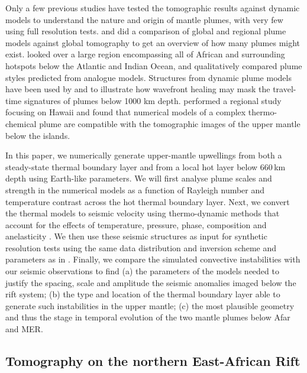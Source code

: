 \documentclass[a4paper,10pt,twocolumn]{paper}
\begin{document}
Only a few previous studies have tested the tomographic results against dynamic models to understand the nature and origin of mantle plumes, with very few using full resolution tests. \cite{boschi-etal-2007} and \cite{styles-etal-2011} did a comparison of global and regional plume models against global tomography to get an overview of how many plumes might exist. \cite{davaille-etal-2005} looked over a large region encompassing all of African and surrounding hotspots below the Atlantic and Indian Ocean, and qualitatively compared plume styles predicted from analogue models. Structures from dynamic plume models have been used by \cite{hwang-etal-2011} and \cite{maguire-etal-2016} to illustrate how wavefront healing may mask the travel-time signatures of plumes below 1000 km depth. \cite{ballmer-etal-2013} performed a regional study focusing on Hawaii and found that numerical models of a complex thermo-chemical plume are compatible with the tomographic images of the upper mantle below the islands.

In this paper, we numerically generate upper-mantle upwellings from both a steady-state thermal boundary layer and from a local hot layer below 660\,km depth using Earth-like parameters. We will first analyse plume scales and strength in the numerical models as a function of Rayleigh number and temperature contrast across the hot thermal boundary layer. Next, we convert the thermal models to seismic velocity using thermo-dynamic methods that account for the effects of temperature, pressure, phase, composition and anelasticity \citep{cobden-etal-2008,goes-etal-2004,styles-etal-2011b}. We then use these seismic structures as input for synthetic resolution tests using the same data distribution and inversion scheme and parameters as in \cite{civiero-etal-2015,civiero-etal-2016}. Finally, we compare the simulated convective instabilities with our seismic observations to find (a) the parameters of the models needed to justify the spacing, scale and amplitude the seismic anomalies imaged below the rift system; (b) the type and location of the thermal boundary layer able to generate such instabilities in the upper mantle; (c) the most plausible geometry and thus the stage in temporal evolution of the two mantle plumes below Afar and MER.

\subsection{Tomography on the northern East-African Rift}
\end{document}

